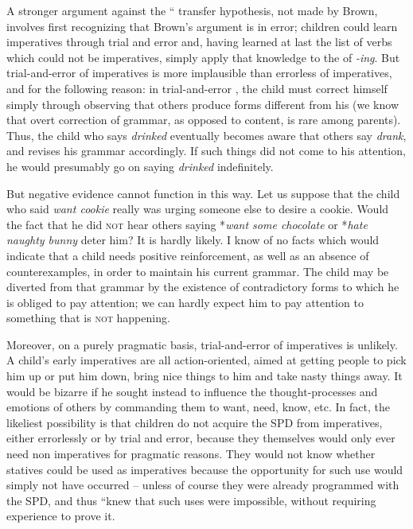 A stronger argument against the `` transfer hypothesis,
not made by Brown, involves first recognizing that Brown's argument is in error; children could learn imperatives through trial and error and, having learned at last the list of verbs which could not be imperatives, simply apply that knowledge to the  of \textit{-ing}. But trial-and-error  of imperatives is more implausible than errorless  of imperatives, and for the following reason: in trial-and-error , the child must correct himself simply through observing that others produce forms different from his (we know that overt correction of grammar, as opposed to content, is rare among parents). Thus, the child who says \textit{drinked} eventually becomes aware that others say \textit{drank}, and revises his grammar accordingly. If such things did not come to his attention, he would presumably go on saying \textit{drinked} indefinitely.

But negative evidence cannot function in this way. Let us sup\-pose that the child who said \textit{want cookie} really was urging someone else to desire a cookie. Would the fact that he did \textsc{not} hear others saying *\textit{want some chocolate} or *\textit{hate naughty bunny} deter him? It is hardly likely. I know of no facts which would indicate that a child needs positive reinforcement, as well as an absence of counterexamples, in order to maintain his current grammar. The child may be diverted from that grammar by the existence of contradictory forms to which he is obliged to pay attention; we can hardly expect him to pay atten\-tion to something that is \textsc{not} happening.

Moreover, on a purely pragmatic basis, trial-and-error  of imperatives is unlikely. A child's early imperatives are all action-oriented, aimed at getting people to pick him up or put him down, bring nice things to him and take nasty things away. It would be bizarre if he sought instead to influence the thought-processes and emotions of others by commanding them to want, need, know, etc. In fact, the likeliest possibility is that children do not acquire the SPD from imperatives, either errorlessly or by trial and error, because they themselves would only ever need non imperatives for pragmatic reasons. They would not know whether statives could be used as imperatives because the opportunity for such use would simply not
have occurred -- unless of course they were already programmed with the SPD, and thus ``knew that such uses were impossible, without requiring experience to prove it.

